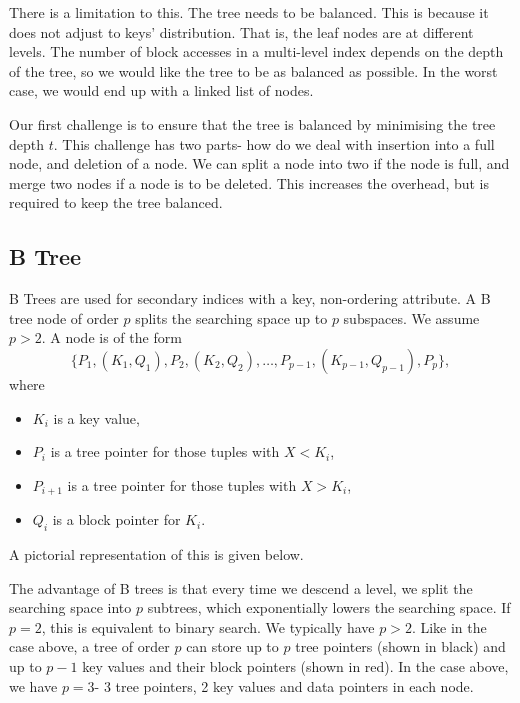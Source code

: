 \documentclass[a4paper, openany]{memoir}
\newcommand{\bnode}[3]{
    \draw (0+#1, 0+#2) -- (4.25+#1, 0+#2)
        -- (4.25+#1, 0.5+#2) 
        -- (0+#1, 0.5+#2)
        -- cycle;
    \foreach \i in {0.75, 1.75, 2.5, 3.5} {
        \draw (\i+#1, 0+#2) -- (\i+#1, 0.5+#2);
    }
    \foreach \i in {0, 1.75, 3.5} {
        \draw[fill=black] (\i+0.75/2+#1, 0.25+#2) circle (2pt);
    }
    \foreach \i in {0.75, 2.5} {
        \filldraw[red] (\i+0.75+#1, 0.25+#2) circle (2pt);
    }
    \foreach \x[count=\i] in {#3} {
        \node at (1.75*\i+#1-0.675, 0.25+#2) {\texttt{\x}};
    }
}
\begin{document}
There is a limitation to this. The tree needs to be balanced. This is because it does not adjust to keys' distribution. That is, the leaf nodes are at different levels. The number of block accesses in a multi-level index depends on the depth of the tree, so we would like the tree to be as balanced as possible. In the worst case, we would end up with a linked list of nodes.

Our first challenge is to ensure that the tree is balanced by minimising the tree depth $t$. This challenge has two parts- how do we deal with insertion into a full node, and deletion of a node. We can split a node into two if the node is full, and merge two nodes if a node is to be deleted. This increases the overhead, but is required to keep the tree balanced.

\subsection{B Tree}
B Trees are used for secondary indices with a key, non-ordering attribute. A B tree node of order $p$ splits the searching space up to $p$ subspaces. We assume $p > 2$. A node is of the form
\[\{P_1, (K_1, Q_1), P_2, (K_2, Q_2), \dots, P_{p-1}, (K_{p-1}, Q_{p-1}), P_p\},\]
where 
\begin{itemize}
    \item $K_i$ is a key value, 
    \item $P_i$ is a tree pointer for those tuples with $X < K_i$,
    \item $P_{i+1}$ is a tree pointer for those tuples with $X > K_i$,
    \item $Q_i$ is a block pointer for $K_i$.
\end{itemize}
A pictorial representation of this is given below.
\begin{figure}[H]
    \centering
\end{figure}

The advantage of B trees is that every time we descend a level, we split the searching space into $p$ subtrees, which exponentially lowers the searching space. If $p = 2$, this is equivalent to binary search. We typically have $p > 2$. Like in the case above, a tree of order $p$ can store up to $p$ tree pointers (shown in black) and up to $p-1$ key values and their block pointers (shown in red). In the case above, we have $p = 3$- 3 tree pointers, 2 key values and data pointers in each node.
\end{document}
